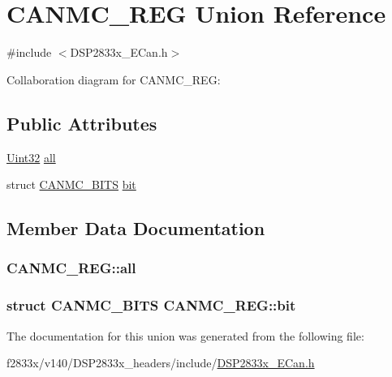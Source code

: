 \hypertarget{union_c_a_n_m_c___r_e_g}{}\section{C\+A\+N\+M\+C\+\_\+\+R\+E\+G Union Reference}
\label{union_c_a_n_m_c___r_e_g}


{\ttfamily \#include $<$D\+S\+P2833x\+\_\+\+E\+Can.\+h$>$}



Collaboration diagram for C\+A\+N\+M\+C\+\_\+\+R\+E\+G\+:
\subsection*{Public Attributes}
\begin{DoxyCompactItemize}
\item 
\hyperlink{_d_s_p2833x___device_8h_aba99025e657f892beb7ff31cecf64653}{Uint32} \hyperlink{union_c_a_n_m_c___r_e_g_a0c84f9b88631c4815a7f7a0ea0be8a38}{all}
\item 
struct \hyperlink{struct_c_a_n_m_c___b_i_t_s}{C\+A\+N\+M\+C\+\_\+\+B\+I\+T\+S} \hyperlink{union_c_a_n_m_c___r_e_g_a4a6f079f8895dc532e50918c6d368c41}{bit}
\end{DoxyCompactItemize}


\subsection{Member Data Documentation}
\hypertarget{union_c_a_n_m_c___r_e_g_a0c84f9b88631c4815a7f7a0ea0be8a38}{}
\subsubsection[{all}]{ C\+A\+N\+M\+C\+\_\+\+R\+E\+G\+::all}\label{union_c_a_n_m_c___r_e_g_a0c84f9b88631c4815a7f7a0ea0be8a38}
\hypertarget{union_c_a_n_m_c___r_e_g_a4a6f079f8895dc532e50918c6d368c41}{}
\subsubsection[{bit}]{\setlength{\rightskip}{0pt plus 5cm}struct {\bf C\+A\+N\+M\+C\+\_\+\+B\+I\+T\+S} C\+A\+N\+M\+C\+\_\+\+R\+E\+G\+::bit}\label{union_c_a_n_m_c___r_e_g_a4a6f079f8895dc532e50918c6d368c41}


The documentation for this union was generated from the following file\+:\begin{DoxyCompactItemize}
\item 
f2833x/v140/\+D\+S\+P2833x\+\_\+headers/include/\hyperlink{_d_s_p2833x___e_can_8h}{D\+S\+P2833x\+\_\+\+E\+Can.\+h}\end{DoxyCompactItemize}
